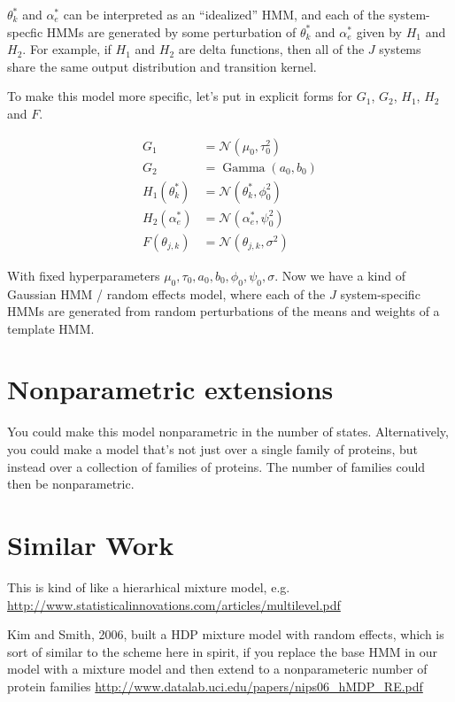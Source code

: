 \documentclass[twocolumn,floatfix,nofootinbib,aps]{revtex4-1}
\begin{document}
$\theta^*_k$ and $\alpha^*_e$ can be interpreted as an ``idealized'' HMM, and each of the system-specfic HMMs are generated by some perturbation of $\theta^*_k$ and $\alpha^*_e$ given by $H_1$ and $H_2$. For example, if $H_1$ and $H_2$ are delta functions, then all of the $J$ systems share the same output distribution and transition kernel.

To make this model more specific, let's put in explicit forms for $G_1$, $G_2$, $H_1$, $H_2$ and $F$.


\begin{align}
G_1 & = \mathcal{N}(\mu_0, \tau_0^2) \\
G_2 & = \operatorname{Gamma}(a_0, b_0) \\
H_1(\theta^*_k) & = \mathcal{N}(\theta^*_k, \phi_0^2) \\
H_2(\alpha_e^*) & = \mathcal{N}(\alpha_e^*, \psi^2_0) \\
F(\theta_{j,k}) &= \mathcal{N}(\theta_{j,k}, \sigma^2)
\end{align}

With fixed hyperparameters $\mu_0, \tau_0, a_0, b_0, \phi_0, \psi_0, \sigma$. Now we have a kind of Gaussian HMM / random effects model, where each of the $J$ system-specific HMMs are generated from random perturbations of the means and weights of a template HMM.

\section{Nonparametric extensions}
You could make this model nonparametric in the number of states. Alternatively, you could make a model that's not just over a single family of proteins, but instead over a collection of families of proteins. The number of families could then be nonparametric.

\section{Similar Work}

This is kind of like a hierarhical mixture model, e.g. \url{http://www.statisticalinnovations.com/articles/multilevel.pdf}

Kim and Smith, 2006, built a HDP mixture model with random effects, which is sort of similar to the scheme here in spirit, if you replace the base HMM in our model with a mixture model and then extend to a nonparameteric number of protein families \url{http://www.datalab.uci.edu/papers/nips06_hMDP_RE.pdf}
\end{document}
